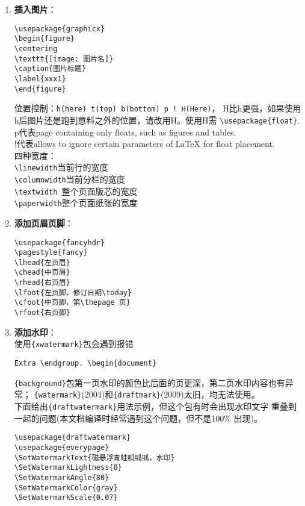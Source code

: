\documentclass[fontset=windows]{article}
\newcommand{\q}{\quad}
\renewcommand{\today}{\number\year-\number\month-\number\day}
\begin{document}
\begin{multicols}{2}
\begin{enumerate}
\item \textbf{插入图片}：
\begin{lstlisting}
\usepackage{graphicx}    
\begin{figure}
\centering
\texttt{[image: 图片名]}
\caption{图片标题}
\label{xxx1}
\end{figure} 
\end{lstlisting} 
位置控制：\verb|h(here) t(top) b(bottom) p ! H(Here)|，
H比h更强，如果使用h后图片还是跑到意料之外的位置，请改用H。使用H需
\verb|\usepackage{float}|.  \\
p代表page containing only floats, such as figures and tables. \\
!代表allows to ignore certain parameters of LaTeX for float placement.\\
四种宽度：\\
\verb|\linewidth|\q\q 当前行的宽度 \\
\verb|\columnwidth|\q 当前分栏的宽度 \\
\verb|\textwidth|\q\q\ 整个页面版芯的宽度 \\
\verb|\paperwidth|\q\q 整个页面纸张的宽度


\item \textbf{添加页眉页脚}：
\begin{lstlisting}
\usepackage{fancyhdr}
\pagestyle{fancy}
\lhead{左页眉}
\chead{中页眉}
\rhead{右页眉}
\lfoot{左页脚，修订日期\today}
\cfoot{中页脚，第\thepage 页}
\rfoot{右页脚}
\end{lstlisting} 

\item \textbf{添加水印}：\\
使用\verb|{xwatermark}|包会遇到报错
\begin{lstlisting}
Extra \endgroup. \begin{document}
\end{lstlisting} 
\verb|{background}|包第一页水印的颜色比后面的页更深，第二页水印内容也有异常；
\verb|{watermark}|(2004)和\verb|{draftmark}|(2009)太旧，均无法使用。\\
下面给出\verb|{draftwatermark}|用法示例，但这个包有时会出现水印文字
重叠到一起的问题(本文档编译时经常遇到这个问题，但不是100\% 出现)。
\begin{lstlisting}
\usepackage{draftwatermark}
\usepackage{everypage}
\SetWatermarkText{磁悬浮青蛙呱呱呱，水印}
\SetWatermarkLightness{0}
\SetWatermarkAngle{80}
\SetWatermarkColor{gray}
\SetWatermarkScale{0.07}
\end{lstlisting} 


\end{enumerate}
\end{multicols}
\end{document}

